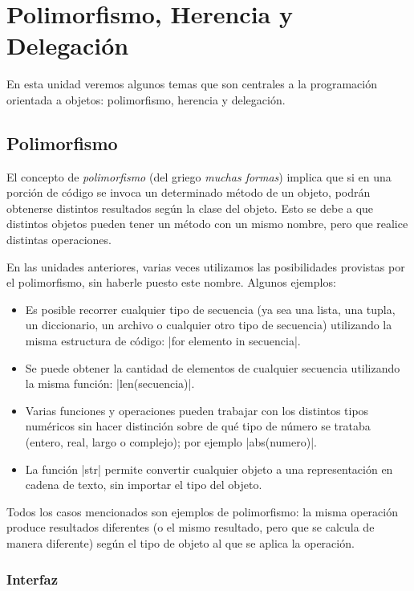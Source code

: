 \chapter{Polimorfismo, Herencia y Delegación}

En esta unidad veremos algunos temas que son centrales a la programación
orientada a objetos: polimorfismo, herencia y delegación.

\section{Polimorfismo}

El concepto de \emph{polimorfismo} (del griego \emph{muchas formas}) implica
que si en una porción de código se invoca un determinado método de un
objeto, podrán obtenerse distintos resultados según la clase del objeto.
Esto se debe a que distintos objetos pueden tener un método con un mismo
nombre, pero que realice distintas operaciones.

En las unidades anteriores, varias veces utilizamos las posibilidades
provistas por el polimorfismo, sin haberle puesto este nombre. Algunos
ejemplos:

\begin{itemize}
\item Es posible recorrer cualquier tipo de secuencia
(ya sea una lista, una tupla, un diccionario, un archivo o cualquier otro tipo
de secuencia) utilizando la misma estructura de código:
|for elemento in secuencia|.

\item Se puede obtener la cantidad de
elementos de cualquier secuencia utilizando la misma función: |len(secuencia)|.

\item Varias funciones y operaciones pueden trabajar con los
distintos tipos numéricos sin hacer distinción sobre de qué tipo de número
se trataba (entero, real, largo o complejo); por ejemplo |abs(numero)|.

\item La función |str| permite convertir cualquier objeto a una representación
en cadena de texto, sin importar el tipo del objeto.
\end{itemize}

Todos los casos mencionados son ejemplos de polimorfismo: la misma operación
produce resultados diferentes (o el mismo resultado, pero que se calcula de
manera diferente) según el tipo de objeto al que se aplica la operación.

\subsection{Interfaz}

